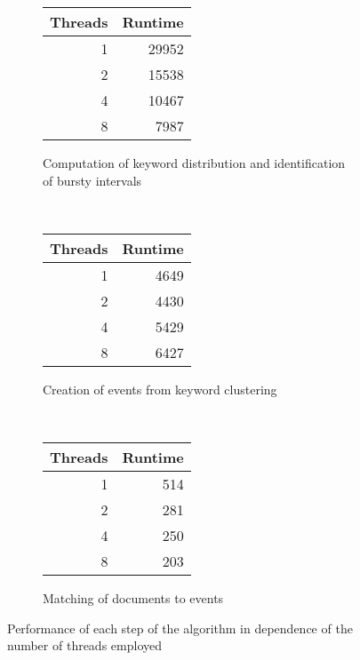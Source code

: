 \begin{figure}
	\centering
	\begin{subfigure}[t]{0.3\textwidth}
		\begin{tabular}{r | r}
			\textbf{Threads} & \textbf{Runtime}\\
			\hline
			1 & 29952\\
			2 & 15538\\
			4 & 10467\\
			8 & 7987
		\end{tabular}
		\caption{Computation of keyword distribution and identification of bursty intervals}
	\end{subfigure}~
	\begin{subfigure}[t]{0.3\textwidth}
		\begin{tabular}{r | r}
			\textbf{Threads} & \textbf{Runtime}\\
			\hline
			1 & 4649\\
			2 & 4430\\
			4 & 5429\\
			8 & 6427
		\end{tabular}
		\caption{Creation of events from keyword clustering}
	\end{subfigure}~
	\begin{subfigure}[t]{0.3\textwidth}
		\begin{tabular}{r | r}
			\textbf{Threads} & \textbf{Runtime}\\
			\hline
			1 & 514\\
			2 & 281\\
			4 & 250\\
			8 & 203
		\end{tabular}
		\caption{Matching of documents to events}
	\end{subfigure}
	\caption{Performance of each step of the algorithm in dependence of the number of threads employed}
	\label{fig:scalability}
\end{figure}
